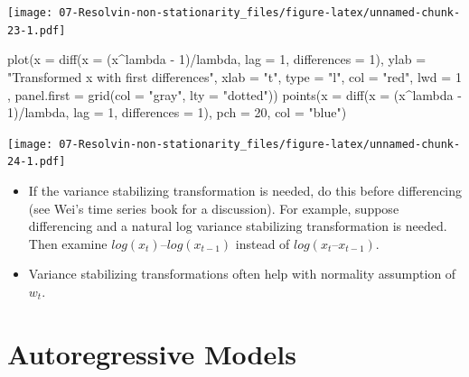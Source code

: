 \documentclass[
]{book}
\newenvironment{Shaded}{\begin{snugshade}}{\end{snugshade}}
\newcommand{\AttributeTok}[1]{\textcolor[rgb]{0.77,0.63,0.00}{#1}}
\newcommand{\DecValTok}[1]{\textcolor[rgb]{0.00,0.00,0.81}{#1}}
\newcommand{\FunctionTok}[1]{\textcolor[rgb]{0.00,0.00,0.00}{#1}}
\newcommand{\NormalTok}[1]{#1}
\newcommand{\SpecialCharTok}[1]{\textcolor[rgb]{0.00,0.00,0.00}{#1}}
\newcommand{\StringTok}[1]{\textcolor[rgb]{0.31,0.60,0.02}{#1}}
\providecommand{\tightlist}{%
  \setlength{\itemsep}{0pt}\setlength{\parskip}{0pt}}
\theoremstyle{definition}
\theoremstyle{definition}
\theoremstyle{definition}
\theoremstyle{definition}
\theoremstyle{remark}
\begin{document}
\texttt{[image: 07-Resolvin-non-stationarity\_files/figure-latex/unnamed-chunk-23-1.pdf]}

\begin{Shaded}
\begin{Highlighting}[]
\FunctionTok{plot}\NormalTok{(}\AttributeTok{x =} \FunctionTok{diff}\NormalTok{(}\AttributeTok{x =}\NormalTok{ (x}\SpecialCharTok{\^{}}\NormalTok{lambda }\SpecialCharTok{{-}} \DecValTok{1}\NormalTok{)}\SpecialCharTok{/}\NormalTok{lambda, }\AttributeTok{lag =} \DecValTok{1}\NormalTok{, }\AttributeTok{differences =} \DecValTok{1}\NormalTok{),}
    \AttributeTok{ylab =} \StringTok{"Transformed x with first differences"}\NormalTok{, }\AttributeTok{xlab =} \StringTok{"t"}\NormalTok{, }\AttributeTok{type =} \StringTok{"l"}\NormalTok{,}
    \AttributeTok{col =} \StringTok{"red"}\NormalTok{, }\AttributeTok{lwd =} \DecValTok{1}\NormalTok{ ,}
    \AttributeTok{panel.first =} \FunctionTok{grid}\NormalTok{(}\AttributeTok{col =} \StringTok{"gray"}\NormalTok{, }\AttributeTok{lty =} \StringTok{"dotted"}\NormalTok{))}
\FunctionTok{points}\NormalTok{(}\AttributeTok{x =} \FunctionTok{diff}\NormalTok{(}\AttributeTok{x =}\NormalTok{ (x}\SpecialCharTok{\^{}}\NormalTok{lambda }\SpecialCharTok{{-}} \DecValTok{1}\NormalTok{)}\SpecialCharTok{/}\NormalTok{lambda, }\AttributeTok{lag =} \DecValTok{1}\NormalTok{, }\AttributeTok{differences =} \DecValTok{1}\NormalTok{), }\AttributeTok{pch =} \DecValTok{20}\NormalTok{, }\AttributeTok{col =} \StringTok{"blue"}\NormalTok{)}
\end{Highlighting}
\end{Shaded}

\texttt{[image: 07-Resolvin-non-stationarity\_files/figure-latex/unnamed-chunk-24-1.pdf]}

\begin{itemize}
\tightlist
\item
  If the variance stabilizing transformation is needed, do this before differencing (see Wei's time series book for a discussion). For example, suppose differencing and a natural log variance stabilizing transformation is needed. Then examine \(log(x_t) – log(x_{t-1})\) instead of \(log(x_t – x_{t-1}).\)
\item
  Variance stabilizing transformations often help with normality assumption of \(w_t\).
\end{itemize}

\hypertarget{autoregressive-models}{%
\chapter{Autoregressive Models}\label{autoregressive-models}}
\end{document}
